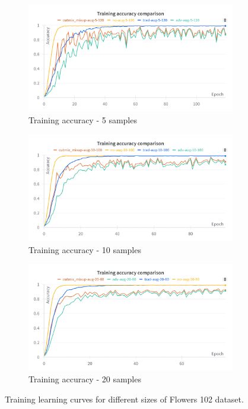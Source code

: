 \begin{figure}[!h]
    \centering
    \begin{subfigure}[b]{0.77\textwidth}
        \centering
        \includegraphics[width=\textwidth]{Images/oneshot/lc/train_acc_5.png}
        \caption{Training accuracy - 5 samples}
    \end{subfigure}

    \begin{subfigure}[b]{0.77\textwidth}
        \centering
        \includegraphics[width=\textwidth]{Images/oneshot/lc/train_acc_10.png}
        \caption{Training accuracy - 10 samples}
    \end{subfigure}


    \begin{subfigure}[b]{0.77\textwidth}
        \centering
        \includegraphics[width=\textwidth]{Images/oneshot/lc/train_acc_20.png}
        \caption{Training accuracy - 20 samples}
    \end{subfigure}

    \caption{Training learning curves for different sizes of Flowers 102 dataset.}
    \label{fig:oneshotLCsTrain}
   
\end{figure}

